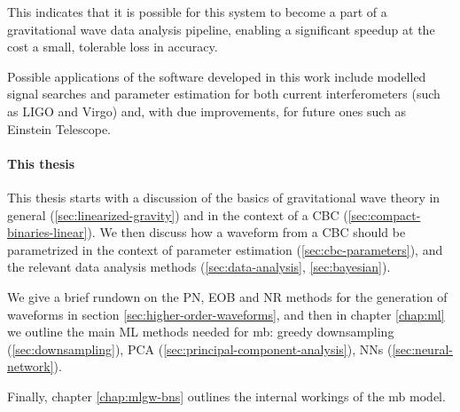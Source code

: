 \documentclass[main.tex]{subfiles}
\begin{document}
This indicates that it is possible for this system to become a part of a gravitational wave data analysis pipeline, enabling a significant speedup at the cost a small, tolerable loss in accuracy.

Possible applications of the software developed in this work include modelled signal searches and parameter estimation for both current interferometers (such as LIGO and Virgo) and, with due improvements, for future ones such as Einstein Telescope.

\paragraph{This thesis}

This thesis starts with a discussion of the basics of gravitational wave theory in general (\ref{sec:linearized-gravity}) and in the context of a \ac{CBC} (\ref{sec:compact-binaries-linear}).
We then discuss how a waveform from a \ac{CBC} should be parametrized in the context of parameter estimation (\ref{sec:cbc-parameters}), and the relevant data analysis methods (\ref{sec:data-analysis}, \ref{sec:bayesian}). 

We give a brief rundown on the \ac{PN}, \ac{EOB} and \ac{NR} methods for the generation of waveforms in section \ref{sec:higher-order-waveforms}, and then in chapter \ref{chap:ml} we outline the main \ac{ML} methods needed for \ac{mb}: greedy downsampling (\ref{sec:downsampling}), \ac{PCA} (\ref{sec:principal-component-analysis}), \acp{NN} (\ref{sec:neural-network}). 

Finally, chapter \ref{chap:mlgw-bns} outlines the internal workings of the \ac{mb} model. 
\end{document}
